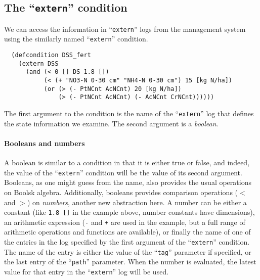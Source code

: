 \documentclass[a4paper]{article}
\newcommand{\dname}[1]{``\texttt{#1}''}
\begin{document}
\subsection{The \dname{extern} condition}

We can access the information in \dname{extern} logs from the
management system using the similarly named \dname{extern} condition.
\begin{verbatim}
  (defcondition DSS_fert
    (extern DSS 
      (and (< 0 [] DS 1.8 [])
           (< (+ "NO3-N 0-30 cm" "NH4-N 0-30 cm") 15 [kg N/ha])
           (or (> (- PtNCnt AcNCnt) 20 [kg N/ha])
               (> (- PtNCnt AcNCnt) (- AcNCnt CrNCnt))))))
\end{verbatim}
The first argument to the condition is the name of the \dname{extern}
log that defines the state information we examine.  The second
argument is a \emph{boolean}. 

\paragraph{Booleans and numbers} A boolean is similar to a condition
in that it is either true or false, and indeed, the value of the
\dname{extern} condition will be the value of its second argument.
Booleans, as one might guess from the name, also provides the usual
operations on Boolsk algebra.  Additionally, booleans provides
comparison operations ($<$ and $>$) on \emph{numbers}, another new
abstraction here.  A number can be either a constant (like \texttt{1.8
  []} in the example above, number constants have dimensions), an
arithmetic expression (\texttt{-} and \texttt{+} are used in the
example, but a full range of arithmetic operations and functions are
available), or finally the name of one of the entries in the log
specified by the first argument of the \dname{extern} condition.  The
name of the entry is either the value of the \dname{tag} parameter if
specified, or the last entry of the \dname{path} parameter.  When the
number is evaluated, the latest value for that entry in the
\dname{extern} log will be used.
\end{document}
